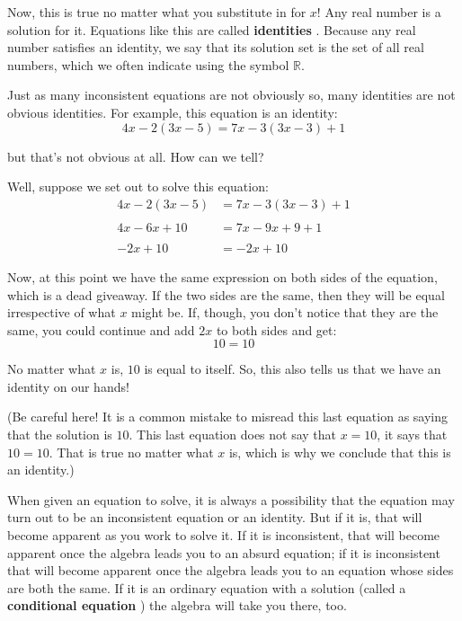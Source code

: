 Now, this is true no matter what you substitute in for $x$! Any real number is a solution for it. Equations like this are called \textbf{identities} . Because any real number satisfies an identity, we say that its solution set is the set of all real numbers, which we often indicate using the symbol $\mathbb{R}$.

Just as many inconsistent equations are not obviously so, many identities are not obvious identities. For example, this equation is an identity:
$$4x-2(3x-5)=7x-3(3x-3)+1$$

but that’s not obvious at all. How can we tell?

Well, suppose we set out to solve this equation:
\begin{align*}
	4x-2(3x-5)&=7x-3(3x-3)+1\\
	\\
	4x-6x+10&=7x-9x+9+1\\
	\\
	-2x+10&=-2x+10
\end{align*}

Now, at this point we have the same expression on both sides of the equation, which is a dead giveaway.  If the two sides are the same, then they will be equal irrespective of what $x$ might be. If, though, you don’t notice that they are the same, you could continue and add $2x$ to both sides and get:
$$10=10$$

No matter what $x$ is, $10$ is equal to itself. So, this also tells us that we have an identity on our hands!

(Be careful here! It is a common mistake to misread this last equation as saying that the solution is $10$. This last equation does not say that $x=10$, it says that $10=10$. That is true no matter what $x$ is, which is why we conclude that this is an identity.)

When given an equation to solve, it is always a possibility that the equation may turn out to be an inconsistent equation or an identity. But if it is, that will become apparent as you work to solve it.  If it is inconsistent, that will become apparent once the algebra leads you to an absurd equation; if it is inconsistent that will become apparent once the algebra leads you to an equation whose sides are both the same. If it is an ordinary equation with a solution (called a \textbf{conditional equation} ) the algebra will take you there, too.


